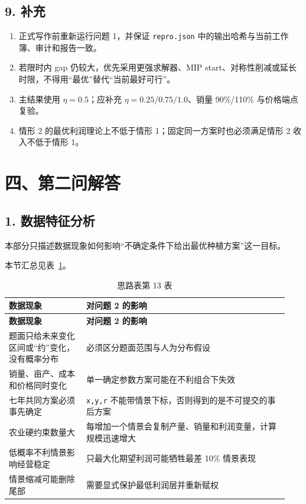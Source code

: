 \documentclass[UTF8,11pt,a4paper]{ctexart}
\begin{document}
\subsection{9. 补充}

\begin{enumerate}
\item 正式写作前重新运行问题 1，并保证 \texttt{repro.json} 中的输出哈希与当前工作簿、审计和报告一致。
\item 若限时内 gap 仍较大，优先采用更强求解器、MIP start、对称性削减或延长时限，不得用“最优”替代“当前最好可行”。
\item 主结果使用 \(\eta{}=0.5\)；应补充 \(\eta{}=0.25/0.75/1.0\)、销量 90\%/110\% 与价格端点复验。
\item 情形 2 的最优利润理论上不低于情形 1；固定同一方案时也必须满足情形 2 收入不低于情形 1。
\end{enumerate}

\section{四、第二问解答}

\subsection{1. 数据特征分析}

本部分只描述数据现象如何影响“不确定条件下给出最优种植方案”这一目标。

\noindent 本节汇总见表~\ref{tab:thought-13}。
\begin{longtable}{@{}>{\raggedright\arraybackslash}p{0.26\linewidth}>{\raggedright\arraybackslash}p{0.68\linewidth}@{}}
\caption{思路表第 13 表}\label{tab:thought-13}\\
\toprule
\textbf{数据现象} & \textbf{对问题 2 的影响} \\
\midrule
\endfirsthead
\toprule
\textbf{数据现象} & \textbf{对问题 2 的影响} \\
\midrule
\endhead
题面只给未来变化区间或“约”变化，没有概率分布 & 必须区分题面范围与人为分布假设 \\
销量、亩产、成本和价格同时变化 & 单一确定参数方案可能在不利组合下失效 \\
七年共同方案必须事先确定 & \texttt{x,y,r} 不能带情景下标，否则得到的是不可提交的事后方案 \\
农业硬约束数量大 & 每增加一个情景会复制产量、销量和利润变量，计算规模迅速增大 \\
低概率不利情景影响经营稳定 & 只最大化期望利润可能牺牲最差 10\% 情景表现 \\
情景缩减可能删除尾部 & 需要显式保护最低利润层并重新赋权 \\
\bottomrule
\end{longtable}
\end{document}
